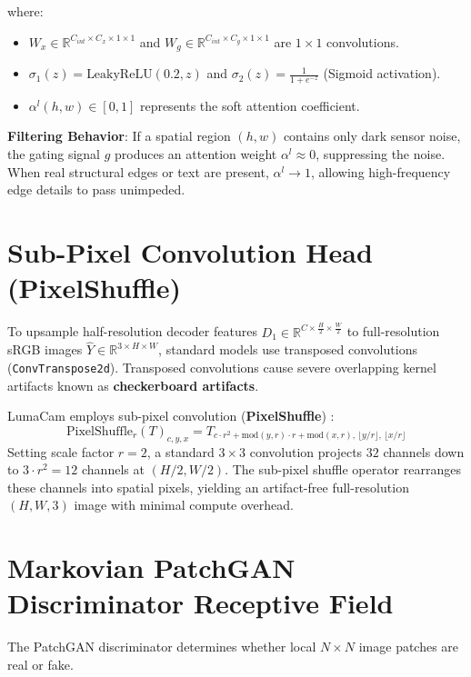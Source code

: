 where:
\begin{itemize}
    \item $W_x \in \mathbb{R}^{C_{int} \times C_x \times 1 \times 1}$ and $W_g \in \mathbb{R}^{C_{int} \times C_g \times 1 \times 1}$ are $1 \times 1$ convolutions.
    \item $\sigma_1(z) = \text{LeakyReLU}(0.2, z)$ and $\sigma_2(z) = \frac{1}{1 + e^{-z}}$ (Sigmoid activation).
    \item $\alpha^l(h, w) \in [0, 1]$ represents the soft attention coefficient.
\end{itemize}

\textbf{Filtering Behavior}: If a spatial region $(h, w)$ contains only dark sensor noise, the gating signal $g$ produces an attention weight $\alpha^l \approx 0$, suppressing the noise. When real structural edges or text are present, $\alpha^l \to 1$, allowing high-frequency edge details to pass unimpeded.

\section{Sub-Pixel Convolution Head (PixelShuffle)}
To upsample half-resolution decoder features $D_1 \in \mathbb{R}^{C \times \frac{H}{2} \times \frac{W}{2}}$ to full-resolution sRGB images $\hat{Y} \in \mathbb{R}^{3 \times H \times W}$, standard models use transposed convolutions (\texttt{ConvTranspose2d}). Transposed convolutions cause severe overlapping kernel artifacts known as \textbf{checkerboard artifacts}.

LumaCam employs sub-pixel convolution (\textbf{PixelShuffle}) \cite{shi2016real}:
\begin{equation}
\text{PixelShuffle}_r(T)_{c, y, x} = T_{c \cdot r^2 + \text{mod}(y, r) \cdot r + \text{mod}(x, r), \, \lfloor y/r \rfloor, \, \lfloor x/r \rfloor}
\label{eq:pixel_shuffle}
\end{equation}
Setting scale factor $r = 2$, a standard $3 \times 3$ convolution projects $32$ channels down to $3 \cdot r^2 = 12$ channels at $(H/2, W/2)$. The sub-pixel shuffle operator rearranges these channels into spatial pixels, yielding an artifact-free full-resolution $(H, W, 3)$ image with minimal compute overhead.

\section{Markovian PatchGAN Discriminator Receptive Field}
The PatchGAN discriminator \cite{isola2017image} determines whether local $N \times N$ image patches are real or fake.

